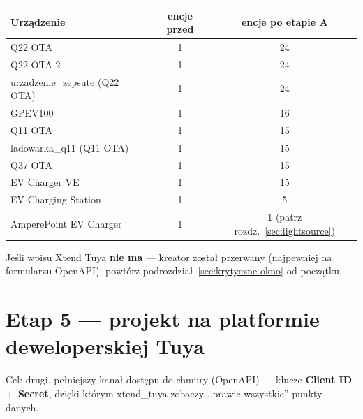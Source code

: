 \documentclass[11pt,a4paper]{article}
\begin{document}
\begin{center}
\begin{tabular}{lcc}
\toprule
\textbf{Urządzenie} & \textbf{encje przed} & \textbf{encje po etapie A}\\
\midrule
Q22 OTA & 1 & 24\\
Q22 OTA 2 & 1 & 24\\
urzadzenie\_zepsute (Q22 OTA) & 1 & 24\\
GPEV100 & 1 & 16\\
Q11 OTA & 1 & 15\\
ladowarka\_q11 (Q11 OTA) & 1 & 15\\
Q37 OTA & 1 & 15\\
EV Charger VE & 1 & 15\\
EV Charging Station & 1 & 5\\
AmperePoint EV Charger & 1 & 1 (patrz rozdz.~\ref{sec:lightsource})\\
\bottomrule
\end{tabular}
\end{center}

Jeśli wpisu Xtend Tuya \textbf{nie ma} --- kreator został przerwany (najpewniej na formularzu OpenAPI); powtórz podrozdział~\ref{sec:krytyczne-okno} od początku.

\section{Etap 5 --- projekt na platformie deweloperskiej Tuya}
\label{sec:etap5}

Cel: drugi, pełniejszy kanał dostępu do chmury (OpenAPI) --- klucze \textbf{Client ID + Secret}, dzięki którym xtend\_tuya zobaczy ,,prawie wszystkie'' punkty danych.
\end{document}
